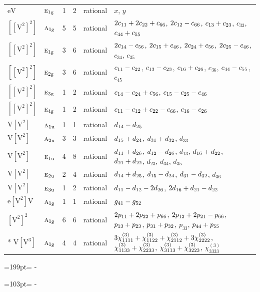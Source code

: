 \documentclass[10pt,a4paper]{article}
\newcommand{\needspace}[1]{\par\penalty-100\begingroup\dimen0=#1\relax\dimen2=\pagegoal
  \advance\dimen2-\pagetotal\ifdim\dimen0>\dimen2\relax\ifdim\dimen2>0pt\vfil\break\fi\fi
  \endgroup}
\numberwithin{equation}{section}
\newcommand{\irr}[1]{\text{\normalfont\scshape #1}}
\newcommand{\ptag}[1]{\mathrm{#1}}
\newcommand{\jahn}[1]{\mathrm{#1}}
\newlength{\fillwidth}\newlength{\cellwidth}\newlength{\colwidth}
\newcommand{\signbreak}{\penalty100\relax}
\begin{document}
{\begin{longtable}{@{}llrrl>{\RaggedRight\arraybackslash}p{\fillwidth}@{}}
$\jahn{eV}$ & $\irr{e}_{1\ptag{g}}$ & 1 & 2 & rational & $x$, $y$\\
$\jahn{[[V^{2}]^{2}]}$ & $\irr{a}_{1\ptag{g}}$ & 5 & 5 & rational & $2c_{11} +\signbreak 2c_{22} +\signbreak c_{66}$, $2c_{12} -\signbreak c_{66}$, $c_{13} +\signbreak c_{23}$, $c_{33}$, $c_{44} +\signbreak c_{55}$\\
$\jahn{[[V^{2}]^{2}]}$ & $\irr{e}_{1\ptag{g}}$ & 3 & 6 & rational & $2c_{14} -\signbreak c_{56}$, $2c_{15} +\signbreak c_{46}$, $2c_{24} +\signbreak c_{56}$, $2c_{25} -\signbreak c_{46}$, $c_{34}$, $c_{35}$\\
$\jahn{[[V^{2}]^{2}]}$ & $\irr{e}_{2\ptag{g}}$ & 3 & 6 & rational & $c_{11} -\signbreak c_{22}$, $c_{13} -\signbreak c_{23}$, $c_{16} +\signbreak c_{26}$, $c_{36}$, $c_{44} -\signbreak c_{55}$, $c_{45}$\\
$\jahn{[[V^{2}]^{2}]}$ & $\irr{e}_{3\ptag{g}}$ & 1 & 2 & rational & $c_{14} -\signbreak c_{24} +\signbreak c_{56}$, $c_{15} -\signbreak c_{25} -\signbreak c_{46}$\\
$\jahn{[[V^{2}]^{2}]}$ & $\irr{e}_{4\ptag{g}}$ & 1 & 2 & rational & $c_{11} -\signbreak c_{12} +\signbreak c_{22} -\signbreak c_{66}$, $c_{16} -\signbreak c_{26}$\\
$\jahn{V[V^{2}]}$ & $\irr{a}_{1\ptag{u}}$ & 1 & 1 & rational & $d_{14} -\signbreak d_{25}$\\
$\jahn{V[V^{2}]}$ & $\irr{a}_{2\ptag{u}}$ & 3 & 3 & rational & $d_{15} +\signbreak d_{24}$, $d_{31} +\signbreak d_{32}$, $d_{33}$\\
$\jahn{V[V^{2}]}$ & $\irr{e}_{1\ptag{u}}$ & 4 & 8 & rational & $d_{11} +\signbreak d_{26}$, $d_{12} -\signbreak d_{26}$, $d_{13}$, $d_{16} +\signbreak d_{22}$, $d_{21} +\signbreak d_{22}$, $d_{23}$, $d_{34}$, $d_{35}$\\
$\jahn{V[V^{2}]}$ & $\irr{e}_{2\ptag{u}}$ & 2 & 4 & rational & $d_{14} +\signbreak d_{25}$, $d_{15} -\signbreak d_{24}$, $d_{31} -\signbreak d_{32}$, $d_{36}$\\
$\jahn{V[V^{2}]}$ & $\irr{e}_{3\ptag{u}}$ & 1 & 2 & rational & $d_{11} -\signbreak d_{12} -\signbreak 2d_{26}$, $2d_{16} +\signbreak d_{21} -\signbreak d_{22}$\\
$\jahn{e[V^{2}]V}$ & $\irr{a}_{1\ptag{g}}$ & 1 & 1 & rational & $\mathnormal{g}_{41} -\signbreak \mathnormal{g}_{52}$\\
$\jahn{[V^{2}]^{2}}$ & $\irr{a}_{1\ptag{g}}$ & 6 & 6 & rational & $2p_{11} +\signbreak 2p_{22} +\signbreak p_{66}$, $2p_{12} +\signbreak 2p_{21} -\signbreak p_{66}$, $p_{13} +\signbreak p_{23}$, $p_{31} +\signbreak p_{32}$, $p_{33}$, $p_{44} +\signbreak p_{55}$\\*
$\jahn{V[V^{3}]}$ & $\irr{a}_{1\ptag{g}}$ & 4 & 4 & rational & $3\chi^{(3)}_{1111} +\signbreak \chi^{(3)}_{1122} +\signbreak \chi^{(3)}_{2112} +\signbreak 3\chi^{(3)}_{2222}$, $\chi^{(3)}_{1133} +\signbreak \chi^{(3)}_{2233}$, $\chi^{(3)}_{3113} +\signbreak \chi^{(3)}_{3223}$, $\chi^{(3)}_{3333}$\\
\bottomrule\end{longtable}}
\needspace{199pt}
\needspace{103pt}
\end{document}
